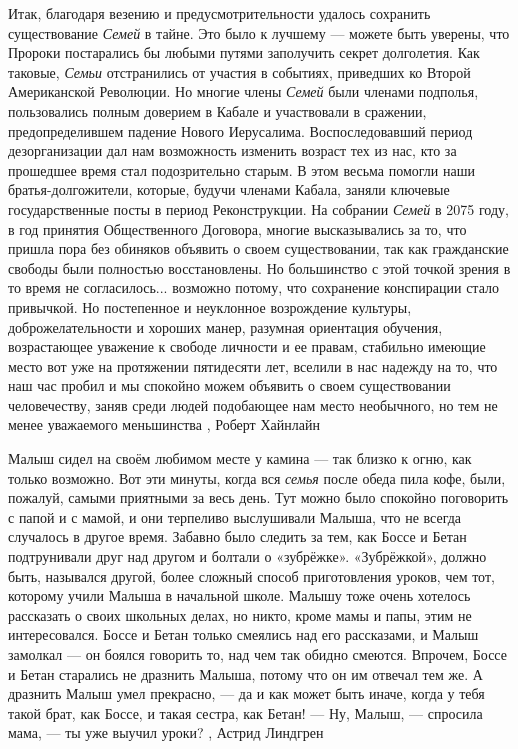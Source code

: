 Итак, благодаря везению и предусмотрительности удалось сохранить существование
\emph{Семей} в тайне. Это было к лучшему — можете быть уверены, что Пророки
постарались бы любыми путями заполучить секрет долголетия.  Как таковые,
\emph{Семьи} отстранились от участия в событиях, приведших ко Второй
Американской Революции. Но многие члены \emph{Семей} были членами подполья,
пользовались полным доверием в Кабале и участвовали в сражении,
предопределившем падение Нового Иерусалима. Воспоследовавший период
дезорганизации дал нам возможность изменить возраст тех из нас, кто за
прошедшее время стал подозрительно старым. В этом весьма помогли наши
братья-долгожители, которые, будучи членами Кабала, заняли ключевые
государственные посты в период Реконструкции.  На собрании \emph{Семей} в 2075
году, в год принятия Общественного Договора, многие высказывались за то, что
пришла пора без обиняков объявить о своем существовании, так как гражданские
свободы были полностью восстановлены. Но большинство с этой точкой зрения в то
время не согласилось... возможно потому, что сохранение конспирации стало
привычкой. Но постепенное и неуклонное возрождение культуры, доброжелательности
и хороших манер, разумная ориентация обучения, возрастающее уважение к свободе
личности и ее правам, стабильно имеющие место вот уже на протяжении пятидесяти
лет, вселили в нас надежду на то, что наш час пробил и мы спокойно можем
объявить о своем существовании человечеству, заняв среди людей подобающее нам
место необычного, но тем не менее уважаемого меньшинства
, Роберт Хайнлайн

Малыш сидел на своём любимом месте у камина — так близко к огню, как только возможно.
Вот эти минуты, когда вся \emph{семья} после обеда пила кофе, были, пожалуй, самыми
приятными за весь день. Тут можно было спокойно поговорить с папой и с мамой, и
они терпеливо выслушивали Малыша, что не всегда случалось в другое время.
Забавно было следить за тем, как Боссе и Бетан подтрунивали друг над другом и
болтали о «зубрёжке». «Зубрёжкой», должно быть, назывался другой, более сложный
способ приготовления уроков, чем тот, которому учили Малыша в начальной школе.
Малышу тоже очень хотелось рассказать о своих школьных делах, но никто, кроме
мамы и папы, этим не интересовался. Боссе и Бетан только смеялись над его
рассказами, и Малыш замолкал — он боялся говорить то, над чем так обидно
смеются. Впрочем, Боссе и Бетан старались не дразнить Малыша, потому что он им
отвечал тем же. А дразнить Малыш умел прекрасно, — да и как может быть иначе,
когда у тебя такой брат, как Боссе, и такая сестра, как Бетан!
— Ну, Малыш, — спросила мама, — ты уже выучил уроки?
, Астрид Линдгрен
